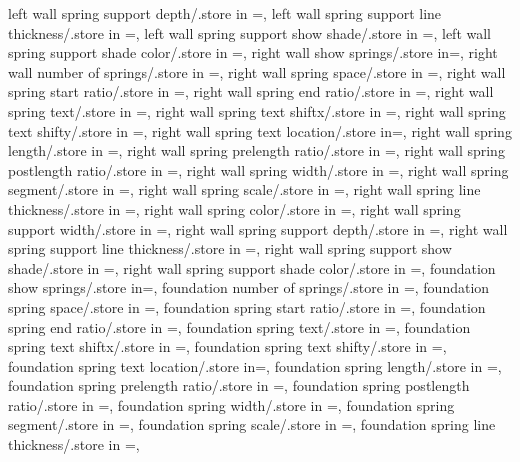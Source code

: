 {  left wall spring support depth/.store in =\leftwsuppdepth,
  left wall spring support line thickness/.store in =\leftwsupplinethk,
  left wall spring support show shade/.store in =\leftwshowsuppshade,
  left wall spring support shade color/.store in =\leftwsuppshadecol,
  right wall show springs/.store in=\rightwshowsprings,
  right wall number of springs/.store in =\rightwspringnumber,
  right wall spring space/.store in =\rightwspringspace,
  right wall spring start ratio/.store in =\rightwspringstartratio,
  right wall spring end ratio/.store in =\rightwspringendratio,
  right wall spring text/.store in =\rightwspringtext,
  right wall spring text shiftx/.store in =\rightwtextshiftx,
  right wall spring text shifty/.store in =\rightwtextshifty,
  right wall spring text location/.store in=\rightwspringtextloc,
  right wall spring length/.store in =\rightwspringlength,
  right wall spring prelength ratio/.store in =\rightwprelenratio,
  right wall spring postlength ratio/.store in =\rightwpostlenratio,
  right wall spring width/.store in =\rightwampl,
  right wall spring segment/.store in =\rightwsegm,
  right wall spring scale/.store in =\rightwspringscale,
  right wall spring line thickness/.store in =\rightwspringthk,
  right wall spring color/.store in =\rightwspringcolor,
  right wall spring support width/.store in =\rightwsuppwidth,
  right wall spring support depth/.store in =\rightwsuppdepth,
  right wall spring support line thickness/.store in =\rightwsupplinethk,
  right wall spring support show shade/.store in =\rightwshowsuppshade,
  right wall spring support shade color/.store in =\rightwsuppshadecol,
  foundation show springs/.store in=\foundshowsprings,
  foundation number of springs/.store in =\foundspringnumber,
  foundation spring space/.store in =\foundspringspace,
  foundation spring start ratio/.store in =\foundspringstartratio,
  foundation spring end ratio/.store in =\foundspringendratio,
  foundation spring text/.store in =\foundspringtext,
  foundation spring text shiftx/.store in =\foundtextshiftx,
  foundation spring text shifty/.store in =\foundtextshifty,
  foundation spring text location/.store in=\foundspringtextloc,
  foundation spring length/.store in =\foundspringlength,
  foundation spring prelength ratio/.store in =\foundprelenratio,
  foundation spring postlength ratio/.store in =\foundpostlenratio,
  foundation spring width/.store in =\foundampl,
  foundation spring segment/.store in =\foundsegm,
  foundation spring scale/.store in =\foundspringscale,
  foundation spring line thickness/.store in =\foundspringthk,
}
